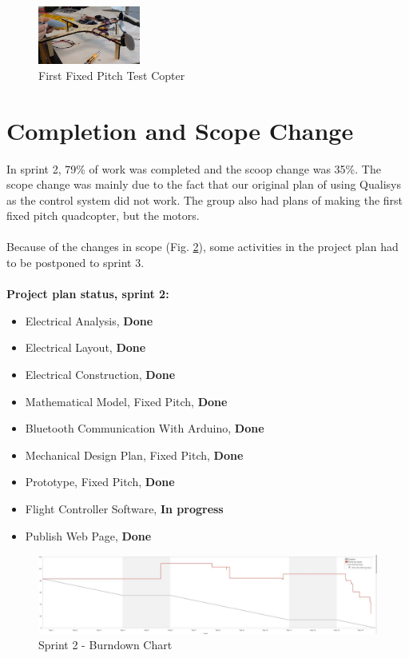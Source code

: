 \begin{figure}[h]
        \centering
        \includegraphics[width = 0.3\textwidth]{VAPIQ-PICTURES//FirstFPQ}
         \caption{First Fixed Pitch Test Copter}
            \label{fig:firstfpq}
    \end{figure}  
   

\clearpage

\section{Completion and Scope Change}

In sprint 2, 79\% of work was completed and the scoop change was 35\%. The scope change was mainly due to the fact that our original plan of using Qualisys as the control system did not work. The group also had plans of making the first fixed pitch quadcopter, but the motors. \\
\\
Because of the changes in scope (Fig. \ref{fig:bds2}), some activities in the project plan had to be postponed to sprint 3.
\\\\

\textbf{Project plan status, sprint 2:}

\begin{itemize}
    \item 	Electrical Analysis,  \textbf{Done}
    \item   Electrical Layout,  \textbf{Done}
    \item   Electrical Construction,  \textbf{Done}
    \item   Mathematical Model, Fixed Pitch,  \textbf{Done}
    \item 	Bluetooth Communication With Arduino,  \textbf{Done}
    \item 	Mechanical Design Plan, Fixed Pitch, \textbf{Done}
    \item 	Prototype, Fixed Pitch, \textbf{Done}
   	\item   Flight Controller Software, \textbf{In progress}
    \item 	Publish Web Page, \textbf{Done}
\end{itemize}

\begin{figure}[h]
        \centering
        \includegraphics[width = 1
        \textwidth]{VAPIQ-PICTURES//SprintBD2}
         \caption{Sprint 2 - Burndown Chart}
        \label{fig:bds2}
    \end{figure}    


